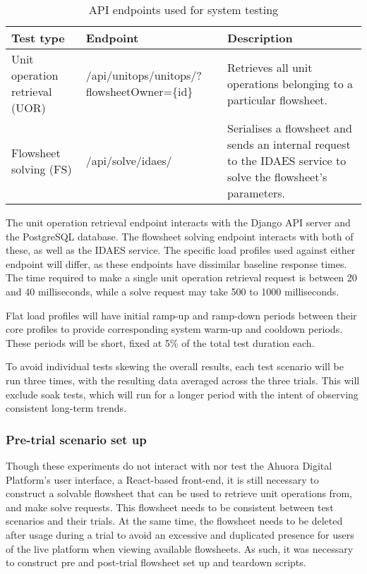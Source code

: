 \begin{table}[h]
    \centering
    \begin{tabularx}{\textwidth}{|p{}|X|p{}|}
        \hline
        \textbf{Test type} & \textbf{Endpoint} & \textbf{Description} \\ \hline
        Unit operation retrieval (UOR) & /api/unitops/unitops/?flowsheetOwner=\{id\} & Retrieves all unit operations belonging to a particular flowsheet. \\ \hline

        Flowsheet solving (FS) & /api/solve/idaes/ & Serialises a flowsheet and sends an internal request to the IDAES service to solve the flowsheet's parameters. \\ \hline
    \end{tabularx}
    \caption{API endpoints used for system testing}
    \label{table:test-api-endpoints}
\end{table}

The unit operation retrieval endpoint interacts with the Django API server and the PostgreSQL database. The flowsheet solving endpoint interacts with both of these, as well as the IDAES service. The specific load profiles used against either endpoint will differ, as these endpoints have dissimilar baseline response times. The time required to make a single unit operation retrieval request is between 20 and 40 milliseconds, while a solve request may take 500 to 1000 milliseconds.


Flat load profiles will have initial ramp-up and ramp-down periods between their core profiles to provide corresponding system warm-up and cooldown periods. These periods will be short, fixed at 5\% of the total test duration each.

To avoid individual tests skewing the overall results, each test scenario will be run three times, with the resulting data averaged across the three trials. This will exclude soak tests, which will run for a longer period with the intent of observing consistent long-term trends.

\subsubsection{Pre-trial scenario set up}

Though these experiments do not interact with nor test the Ahuora Digital Platform's user interface, a React-based front-end, it is still necessary to construct a solvable flowsheet that can be used to retrieve unit operations from, and make solve requests. This flowsheet needs to be consistent between test scenarios and their trials. At the same time, the flowsheet needs to be deleted after usage during a trial to avoid an excessive and duplicated presence for users of the live platform when viewing available flowsheets. As such, it was necessary to construct pre and post-trial flowsheet set up and teardown scripts.

